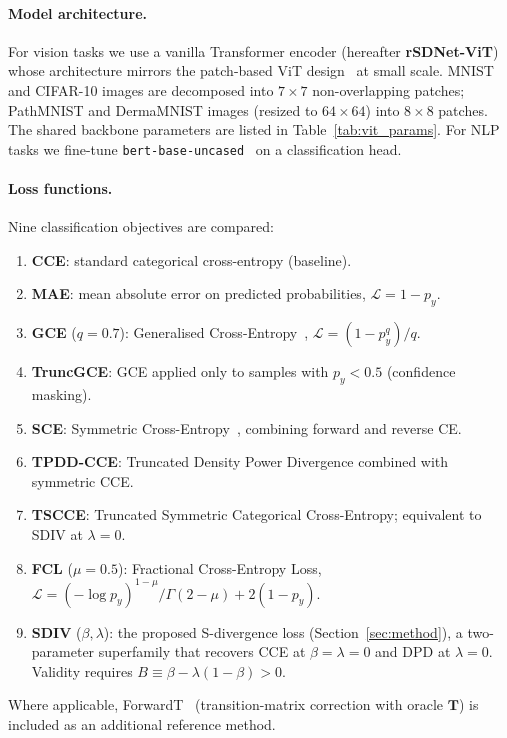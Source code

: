 \paragraph{Model architecture.}
For vision tasks we use a vanilla Transformer encoder (hereafter
\textbf{rSDNet-ViT}) whose architecture mirrors the patch-based ViT
design~\citep{dosovitskiy2021} at small scale.
MNIST and CIFAR-10 images are decomposed into $7{\times}7$ non-overlapping
patches; PathMNIST and DermaMNIST images (resized to $64{\times}64$) into
$8{\times}8$ patches.
The shared backbone parameters are listed in Table~\ref{tab:vit_params}.
For NLP tasks we fine-tune
\texttt{bert-base-uncased}~\citep{devlin2019} on a classification head.

\paragraph{Loss functions.}
Nine classification objectives are compared:
\begin{enumerate}[leftmargin=*,itemsep=2pt]
  \item \textbf{CCE}: standard categorical cross-entropy (baseline).
  \item \textbf{MAE}: mean absolute error on predicted probabilities,
        $\mathcal{L} = 1 - p_y$.
  \item \textbf{GCE} ($q{=}0.7$): Generalised Cross-Entropy~\citep{zhang2018},
        $\mathcal{L} = (1 - p_y^q)/q$.
  \item \textbf{TruncGCE}: GCE applied only to samples with $p_y < 0.5$
        (confidence masking).
  \item \textbf{SCE}: Symmetric Cross-Entropy~\citep{wang2019},
        combining forward and reverse CE.
  \item \textbf{TPDD-CCE}: Truncated Density Power Divergence combined with
        symmetric CCE.
  \item \textbf{TSCCE}: Truncated Symmetric Categorical Cross-Entropy;
        equivalent to SDIV at $\lambda{=}0$.
  \item \textbf{FCL} ($\mu{=}0.5$): Fractional Cross-Entropy Loss,
        $\mathcal{L} = (-\log p_y)^{1-\mu}/\Gamma(2{-}\mu) + 2(1-p_y)$.
  \item \textbf{SDIV} ($\beta,\lambda$): the proposed S-divergence loss
        (Section~\ref{sec:method}), a two-parameter superfamily that recovers
        CCE at $\beta{=}\lambda{=}0$ and DPD at $\lambda{=}0$.
        Validity requires $B \equiv \beta - \lambda(1{-}\beta) > 0$.
\end{enumerate}
Where applicable, ForwardT~\citep{patrini2017} (transition-matrix correction
with oracle $\mathbf{T}$) is included as an additional reference method.

